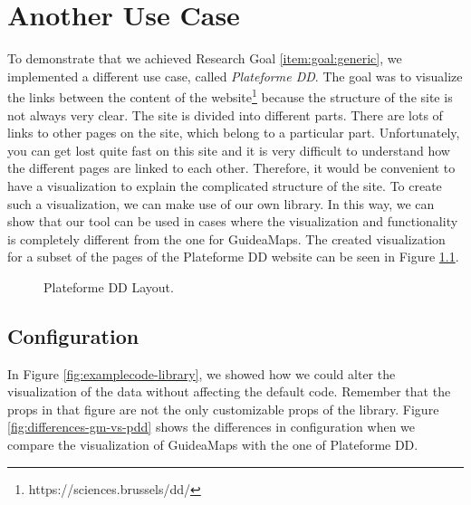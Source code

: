 \chapter{Another Use Case}\label{ch:usecase}
To demonstrate that we achieved Research Goal \ref{item:goal:generic}, we implemented a different use case, called \textit{Plateforme DD}. The goal was to visualize the links between the content of the website\footnote{https://sciences.brussels/dd/} because the structure of the site is not always very clear. The site is divided into different parts. There are lots of links to other pages on the site, which belong to a particular part. Unfortunately, you can get lost quite fast on this site and it is very difficult to understand how the different pages are linked to each other. Therefore, it would be convenient to have a visualization to explain the complicated structure of the site. To create such a visualization, we can make use of our own library. In this way, we can show that our tool can be used in cases where the visualization and functionality is completely different from the one for GuideaMaps. The created visualization for a subset of the pages of the Plateforme DD website can be seen in Figure \ref{fig:plateforme-dd}.\\

\begin{figure}[H]
	\centering
	\caption{Plateforme DD Layout.}
	\label{fig:plateforme-dd}
\end{figure}



\section{Configuration}\label{sec:usecase-configuration}
In Figure \ref{fig:examplecode-library}, we showed how we could alter the visualization of the data without affecting the default code. Remember that the props in that figure are not the only customizable props of the library. Figure \ref{fig:differences-gm-vs-pdd} shows the differences in configuration when we compare the visualization of GuideaMaps with the one of Plateforme DD.

